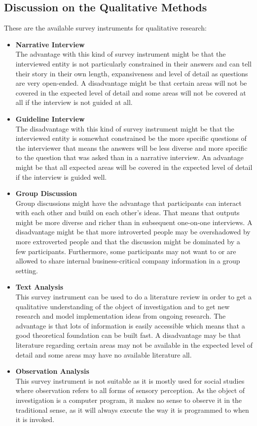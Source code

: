 \documentclass[draft,final]{thesisclass} %
\begin{document}
\subsection{Discussion on the Qualitative Methods}
These are the available survey instruments for qualitative research:
\begin{itemize}
    \item \textbf{Narrative Interview}\\
    The advantage with this kind of survey instrument might be that the interviewed entity is not particularly constrained in their answers and can tell their story in their own length, expansiveness and level of detail as questions are very open-ended.
    A disadvantage might be that certain areas will not be covered in the expected level of detail and some areas will not be covered at all if the interview is not guided at all.
    \item \textbf{Guideline Interview}\\
    The disadvantage with this kind of survey instrument might be that the interviewed entity is somewhat constrained be the more specific questions of the interviewer that means the answers will be less diverse and more specific to the question that was asked than in a narrative interview.
    An advantage might be that all expected areas will be covered in the expected level of detail if the interview is guided well.
    \item \textbf{Group Discussion}\\
    Group discussions might have the advantage that participants can interact with each other and build on each other's ideas. 
    That means that outputs might be more diverse and richer than in subsequent one-on-one interviews.
    A disadvantage might be that more introverted people may be overshadowed by more extroverted people and that the discussion might be dominated by a few participants.
    Furthermore, some participants may not want to or are allowed to share internal business-critical company information in a group setting.
    \item \textbf{Text Analysis}\\
    This survey instrument can be used to do a literature review in order to get a qualitative understanding of the object of investigation and to get new research and model implementation ideas from ongoing research.
    The advantage is that lots of information is easily accessible which means that a good theoretical foundation can be built fast.
    A disadvantage may be that literature regarding certain areas may not be available in the expected level of detail and some areas may have no available literature all.
    \item \textbf{Observation Analysis}\\
    This survey instrument is not suitable as it is mostly used for social studies where observation refers to all forms of sensory perception.
    As the object of investigation is a computer program, it makes no sense to observe it in the traditional sense, as it will always execute the way it is programmed to when it is invoked.
\end{itemize}
\end{document}
